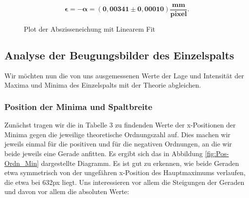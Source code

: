 \documentclass{article}
\begin{document}
\begin{equation}
    \bm{\epsilon = - \alpha = (0,00341 \pm 0,00010) \frac{\textbf{mm}}{\textbf{pixel}}}.
\end{equation}

\begin{figure}[!b]
    \centering
    \caption{Plot der Abszisseneichung mit Linearem Fit}
    \label{fig:Abszisseneichung}
\end{figure}

\clearpage
\newpage
\subsection{Analyse der Beugungsbilder des Einzelspalts}

Wir möchten nun die von uns ausgemessenen Werte der Lage und Intensität der Maxima und Minima des Einzelspalts mit der Theorie abgleichen.

\subsubsection{Position der Minima und Spaltbreite}

Zunächst tragen wir die in Tabelle 3 zu findenden Werte der x-Positionen der Minima gegen die jeweilige theoretische Ordnungszahl auf. Dies machen wir jeweils einmal für die positiven und für die negativen Ordnungen, an die wir beide jeweils eine Gerade anfitten. Es ergibt sich das in Abbildung \ref{fig:Pos-Ordn_Min} dargestellte Diagramm. Es ist gut zu erkennen, wie beide Geraden etwa symmetrisch von der ungefähren x-Position des Hauptmaximums verlaufen, die etwa bei 632px liegt. Uns interessieren vor allem die Steigungen der Geraden und davon vor allem die absoluten Werte:
\end{document}
